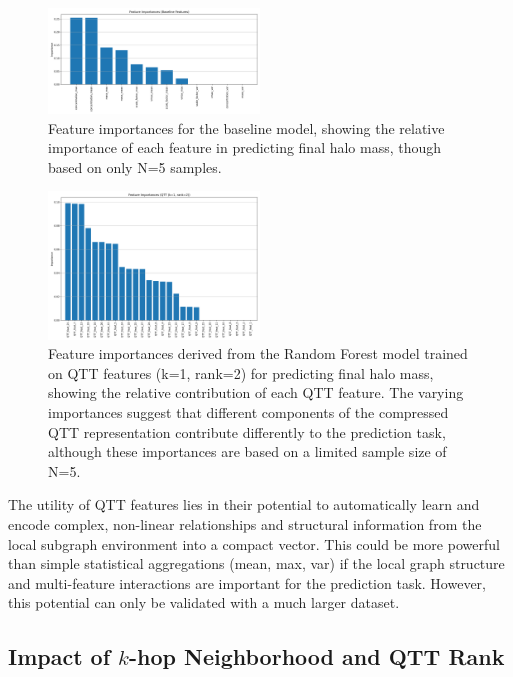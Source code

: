 \documentclass[twocolumn]{aastex631}
\begin{document}
\begin{figure}[h!]
    \centering
    \includegraphics[width=0.5\textwidth]{../input_files/plots/feature_importances_baseline_3_20250524-175150.png}
    \caption{Feature importances for the baseline model, showing the relative importance of each feature in predicting final halo mass, though based on only N=5 samples.
}
    \label{fig:feature_importances_baseline}
\end{figure}

\begin{figure}[h!]
    \centering
    \includegraphics[width=0.5\textwidth]{../input_files/plots/feature_importances_qtt_k1_r2_6_20250524-175150.png}
    \caption{Feature importances derived from the Random Forest model trained on QTT features (k=1, rank=2) for predicting final halo mass, showing the relative contribution of each QTT feature. The varying importances suggest that different components of the compressed QTT representation contribute differently to the prediction task, although these importances are based on a limited sample size of N=5.
}
    \label{fig:feature_importances_qtt}
\end{figure}

The utility of QTT features lies in their potential to automatically learn and encode complex, non-linear relationships and structural information from the local subgraph environment into a compact vector. This could be more powerful than simple statistical aggregations (mean, max, var) if the local graph structure and multi-feature interactions are important for the prediction task. However, this potential can only be validated with a much larger dataset.

\subsection{Impact of $k$-hop Neighborhood and QTT Rank}
\end{document}
